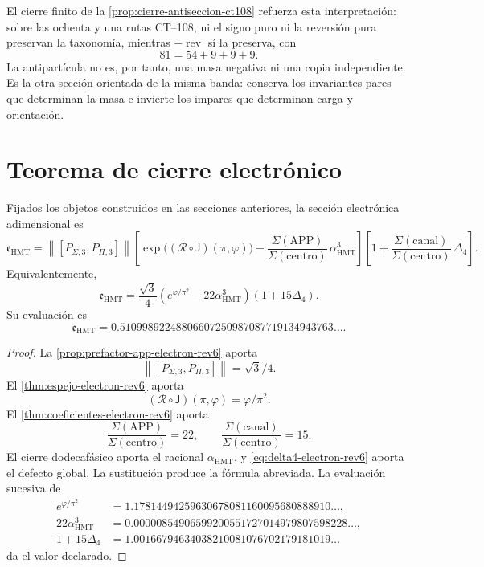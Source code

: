 El cierre finito de la \cref{prop:cierre-antiseccion-ct108} refuerza esta
interpretación: sobre las ochenta y una rutas CT--108, ni el signo puro ni
la reversión pura preservan la taxonomía, mientras
\(-\operatorname{rev}\) sí la preserva, con
\[
 81=54+9+9+9.
\]
La antipartícula no es, por tanto, una masa negativa ni una copia
independiente. Es la otra sección orientada de la misma banda: conserva los
invariantes pares que determinan la masa e invierte los impares que
determinan carga y orientación.

\section{Teorema de cierre electrónico}

\begin{theorem}
\label{thm:cierre-electron-holografico-rev6}
Fijados los objetos construidos en las secciones anteriores, la sección
electrónica adimensional es
\[
 \mathfrak e_{\mathrm{HMT}}
 =
 \left\|[P_{\Sigma,3},P_{\Pi,3}]\right\|
 \left[
 \exp\bigl((\mathscr R\circ\mathsf J)(\pi,\varphi)\bigr)
 -\frac{\Sigma(\mathrm{APP})}
 {\Sigma(\mathrm{centro})}\,
 \alpha_{\mathrm{HMT}}^3
 \right]
 \left[
 1+
 \frac{\Sigma(\mathrm{canal})}
 {\Sigma(\mathrm{centro})}\,
 \Delta_4
 \right].
\]
Equivalentemente,
\[
 \boxed{
 \mathfrak e_{\mathrm{HMT}}
 =
 \frac{\sqrt3}{4}
 \left(e^{\varphi/\pi^2}
 -22\alpha_{\mathrm{HMT}}^3\right)
 (1+15\Delta_4).}
\]
Su evaluación es
\[
 \boxed{
 \mathfrak e_{\mathrm{HMT}}
 =
 0.51099892248806607250987087719134943763\ldots.}
\]
\end{theorem}

\begin{proof}
La \cref{prop:prefactor-app-electron-rev6} aporta
\[
 \left\|[P_{\Sigma,3},P_{\Pi,3}]\right\|=\sqrt3/4.
\]
El \cref{thm:espejo-electron-rev6} aporta
\[
 (\mathscr R\circ\mathsf J)(\pi,\varphi)=\varphi/\pi^2.
\]
El \cref{thm:coeficientes-electron-rev6} aporta
\[
 \frac{\Sigma(\mathrm{APP})}{\Sigma(\mathrm{centro})}=22,
 \qquad
 \frac{\Sigma(\mathrm{canal})}{\Sigma(\mathrm{centro})}=15.
\]
El cierre dodecafásico aporta el racional
\(\alpha_{\mathrm{HMT}}\), y
\cref{eq:delta4-electron-rev6} aporta el defecto global. La sustitución
produce la fórmula abreviada. La evaluación sucesiva de
\[
\begin{aligned}
 e^{\varphi/\pi^2}
 &=1.17814494259630678081160095680888910\ldots,\\
 22\alpha_{\mathrm{HMT}}^3
 &=0.00000854906599200551727014979807598228\ldots,\\
 1+15\Delta_4
 &=1.00166794634038210081076702179181019\ldots
\end{aligned}
\]
da el valor declarado.
\end{proof}


